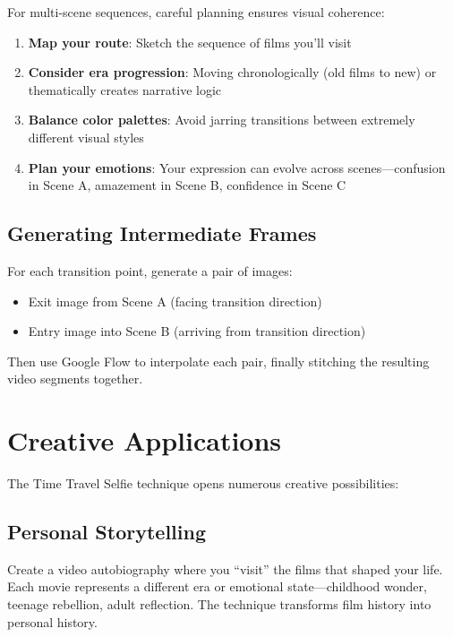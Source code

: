 For multi-scene sequences, careful planning ensures visual coherence:

\begin{enumerate}
\item \textbf{Map your route}: Sketch the sequence of films you'll visit
\item \textbf{Consider era progression}: Moving chronologically (old films to new) or thematically creates narrative logic
\item \textbf{Balance color palettes}: Avoid jarring transitions between extremely different visual styles
\item \textbf{Plan your emotions}: Your expression can evolve across scenes—confusion in Scene A, amazement in Scene B, confidence in Scene C
\end{enumerate}

\subsection{Generating Intermediate Frames}

For each transition point, generate a pair of images:

\begin{itemize}
\item Exit image from Scene A (facing transition direction)
\item Entry image into Scene B (arriving from transition direction)
\end{itemize}

Then use Google Flow to interpolate each pair, finally stitching the resulting video segments together.

\section{Creative Applications}
\label{sec:creative-applications}

The Time Travel Selfie technique opens numerous creative possibilities:

\subsection{Personal Storytelling}

Create a video autobiography where you ``visit'' the films that shaped your life. Each movie represents a different era or emotional state—childhood wonder, teenage rebellion, adult reflection. The technique transforms film history into personal history.

